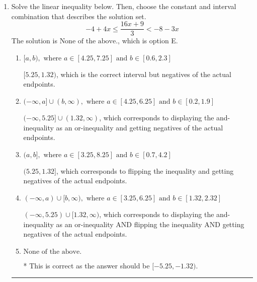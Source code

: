 \documentclass{extbook}[14pt]
\newcommand{\litem}[1]{\item #1

\rule{\textwidth}{0.4pt}}
\begin{document}
\begin{enumerate}
{\begin{enumerate}[label=\Alph*.]
This describes the values less than 4 from 6
\item \( (-\infty, 2] \cup [10, \infty) \)

This describes the values no less than 4 from 6
\item \( [2, 10] \)

This describes the values no more than 4 from 6
\item \( \text{None of the above} \)

You likely thought the values in the interval were not correct.
\end{enumerate}

\textbf{General Comment:} When thinking about this language, it helps to draw a number line and try points.
}
\litem{
Solve the linear inequality below. Then, choose the constant and interval combination that describes the solution set.
\[ -4 + 4 x \leq \frac{16 x + 9}{3} < -8 - 3 x \]The solution is \( \text{None of the above.} \), which is option E.\begin{enumerate}[label=\Alph*.]
\item \( [a, b), \text{ where } a \in [4.25, 7.25] \text{ and } b \in [0.6, 2.3] \)

$[5.25, 1.32)$, which is the correct interval but negatives of the actual endpoints.
\item \( (-\infty, a] \cup (b, \infty), \text{ where } a \in [4.25, 6.25] \text{ and } b \in [0.2, 1.9] \)

$(-\infty, 5.25] \cup (1.32, \infty)$, which corresponds to displaying the and-inequality as an or-inequality and getting negatives of the actual endpoints.
\item \( (a, b], \text{ where } a \in [3.25, 8.25] \text{ and } b \in [0.7, 4.2] \)

$(5.25, 1.32]$, which corresponds to flipping the inequality and getting negatives of the actual endpoints.
\item \( (-\infty, a) \cup [b, \infty), \text{ where } a \in [3.25, 6.25] \text{ and } b \in [1.32, 2.32] \)

$(-\infty, 5.25) \cup [1.32, \infty)$, which corresponds to displaying the and-inequality as an or-inequality AND flipping the inequality AND getting negatives of the actual endpoints.
\item \( \text{None of the above.} \)

* This is correct as the answer should be $[-5.25, -1.32)$.
\end{enumerate}

}
\end{enumerate}
\end{document}
